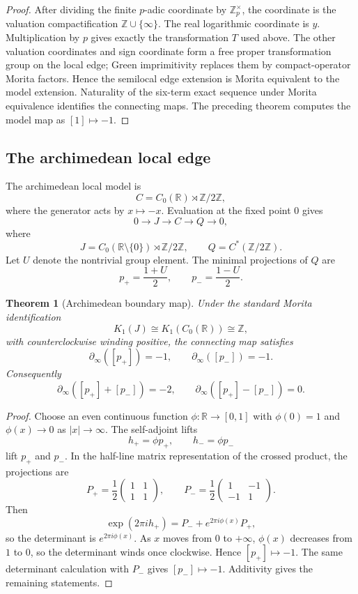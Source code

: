 \documentclass[11pt]{amsart}
\newtheorem{theorem}{Theorem}[section]
\newcommand{\ZZ}{\mathbb Z}
\newcommand{\RR}{\mathbb R}
\newcommand{\Ztwo}{\ZZ/2\ZZ}
\begin{document}
\begin{proof}
After dividing the finite $p$-adic coordinate by $\ZZ_p^\times$, the coordinate is the valuation compactification $\ZZ\cup\{\infty\}$.  The real logarithmic coordinate is $y$.  Multiplication by $p$ gives exactly the transformation $T$ used above.  The other valuation coordinates and sign coordinate form a free proper transformation group on the local edge; Green imprimitivity replaces them by compact-operator Morita factors.  Hence the semilocal edge extension is Morita equivalent to the model extension.  Naturality of the six-term exact sequence under Morita equivalence identifies the connecting maps.  The preceding theorem computes the model map as $[1]\mapsto -1$.\end{proof}

\subsection{The archimedean local edge}

The archimedean local model is
\[
        C=C_0(\RR)\rtimes\Ztwo,
\]
where the generator acts by $x\mapsto -x$.  Evaluation at the fixed point $0$ gives
\[
        0\to J\to C\to Q\to0,
\]
where
\[
        J=C_0(\RR\setminus\{0\})\rtimes\Ztwo,
        \qquad
        Q=C^*(\Ztwo).
\]
Let $U$ denote the nontrivial group element.  The minimal projections of $Q$ are
\[
        p_+=\frac{1+U}{2},
        \qquad
        p_-=\frac{1-U}{2}.
\]

\begin{theorem}[Archimedean boundary map]
Under the standard Morita identification
\[
        K_1(J)\cong K_1(C_0(\RR))\cong\ZZ,
\]
with counterclockwise winding positive, the connecting map satisfies
\[
        \partial_\infty([p_+])=-1,
        \qquad
        \partial_\infty([p_-])=-1.
\]
Consequently
\[
        \partial_\infty([p_+]+[p_-])=-2,
        \qquad
        \partial_\infty([p_+]-[p_-])=0.
\]
\end{theorem}

\begin{proof}
Choose an even continuous function $\phi:\RR\to[0,1]$ with $\phi(0)=1$ and $\phi(x)\to0$ as $|x|\to\infty$.  The self-adjoint lifts
\[
        h_+=\phi p_+,
        \qquad
        h_-=\phi p_-
\]
lift $p_+$ and $p_-$.  In the half-line matrix representation of the crossed product, the projections are
\[
        P_+=\frac12\begin{pmatrix}1&1\\1&1\end{pmatrix},
        \qquad
        P_-=\frac12\begin{pmatrix}1&-1\\-1&1\end{pmatrix}.
\]
Then
\[
        \exp(2\pi i h_+)=P_-+e^{2\pi i\phi(x)}P_+,
\]
so the determinant is $e^{2\pi i\phi(x)}$.  As $x$ moves from $0$ to $+\infty$, $\phi(x)$ decreases from $1$ to $0$, so the determinant winds once clockwise.  Hence $[p_+]\mapsto -1$.  The same determinant calculation with $P_-$ gives $[p_-]\mapsto -1$.  Additivity gives the remaining statements.\end{proof}
\end{document}
